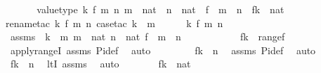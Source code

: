 \begin{isabellebody}
%
\isadelimproof
%
\endisadelimproof
%
\isatagproof
{}\isamarkupfalse%
\ {\isacharminus}{\kern0pt}\ \isanewline
\isanewline
\ \ \isamarkupfalse%
\ value{\isacharunderscore}{\kern0pt}type{\isacharcolon}{\kern0pt}\ {\isachardoublequoteopen}{\isasymAnd}k\ f\ m\ n{\isachardot}{\kern0pt}\ m\ {\isasymin}\ nat\ {\isasymLongrightarrow}\ n\ {\isasymin}\ nat\ {\isasymLongrightarrow}\ f\ {\isasymin}\ m\ {\isasymrightarrow}\ n\ {\isasymLongrightarrow}\ f{\isacharbackquote}{\kern0pt}k\ {\isasymin}\ nat{\isachardoublequoteclose}\ \isanewline
\ \ \isamarkupfalse%
{\isacharparenleft}{\kern0pt}rename{\isacharunderscore}{\kern0pt}tac\ k\ f\ m\ n{\isacharcomma}{\kern0pt}\ case{\isacharunderscore}{\kern0pt}tac\ {\isachardoublequoteopen}k\ {\isasymin}\ m{\isachardoublequoteclose}{\isacharparenright}{\kern0pt}\isanewline
\ \ \ \ \isamarkupfalse%
\ k\ f\ m\ n\ \isamarkupfalse%
\ assms{}\ {\isacharcolon}{\kern0pt}\ {\isachardoublequoteopen}k\ {\isasymin}\ m{\isachardoublequoteclose}\ {\isachardoublequoteopen}m\ {\isasymin}\ nat{\isachardoublequoteclose}\ {\isachardoublequoteopen}n\ {\isasymin}\ nat{\isachardoublequoteclose}\ {\isachardoublequoteopen}f\ {\isasymin}\ m\ {\isasymrightarrow}\ n{\isachardoublequoteclose}\ \ \ \ \isanewline
\ \ \ \ \isamarkupfalse%
\ \isamarkupfalse%
\ {\isachardoublequoteopen}f{\isacharbackquote}{\kern0pt}k\ {\isasymin}\ range{\isacharparenleft}{\kern0pt}f{\isacharparenright}{\kern0pt}{\isachardoublequoteclose}\ \isamarkupfalse%
\ apply{\isacharunderscore}{\kern0pt}rangeI\ assms{}\ Pi{\isacharunderscore}{\kern0pt}def\ \isamarkupfalse%
\ auto\ \isanewline
\ \ \ \ \isamarkupfalse%
\ \isamarkupfalse%
\ {\isachardoublequoteopen}f{\isacharbackquote}{\kern0pt}k\ {\isasymin}\ n{\isachardoublequoteclose}\ \isamarkupfalse%
\ assms{}\ Pi{\isacharunderscore}{\kern0pt}def\ \isamarkupfalse%
\ auto\ \isanewline
\ \ \ \ \isamarkupfalse%
\ \isamarkupfalse%
\ {\isachardoublequoteopen}f{\isacharbackquote}{\kern0pt}k\ {\isacharless}{\kern0pt}\ n{\isachardoublequoteclose}\ \isamarkupfalse%
\ ltI\ assms{}\ \isamarkupfalse%
\ auto\isanewline
\ \ \ \ \isamarkupfalse%
\ \isamarkupfalse%
\ {\isachardoublequoteopen}f{\isacharbackquote}{\kern0pt}k\ {\isasymin}\ nat{\isachardoublequoteclose}\ \isamarkupfalse%

\end{isabellebody}

